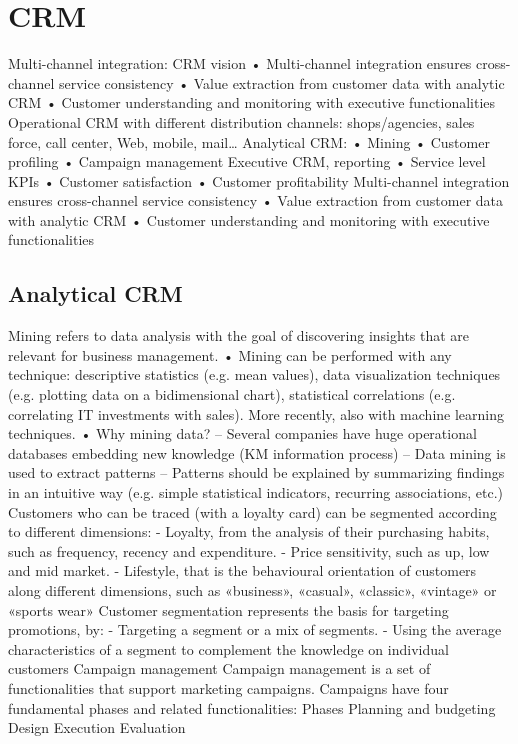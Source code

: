\section{CRM}

Multi-channel integration: CRM vision
• Multi-channel integration ensures cross-channel service consistency
• Value extraction from customer data with analytic CRM
• Customer understanding and monitoring with executive functionalities
Operational CRM with different distribution channels: shops/agencies, sales force, call center, Web,
mobile, mail…
Analytical CRM:
• Mining
• Customer profiling
• Campaign management
Executive CRM, reporting
• Service level KPIs
• Customer satisfaction
• Customer profitability
Multi-channel integration ensures cross-channel service consistency
• Value extraction from customer data with analytic CRM
• Customer understanding and monitoring with executive functionalities

\subsection{Analytical CRM}
Mining refers to data analysis with the goal of discovering insights that are relevant
for business management.
• Mining can be performed with any technique: descriptive statistics (e.g. mean
values), data visualization techniques (e.g. plotting data on a bidimensional chart),
statistical correlations (e.g. correlating IT investments with sales). More recently,
also with machine learning techniques.
• Why mining data?
– Several companies have huge operational databases embedding new knowledge (KM
information process)
– Data mining is used to extract patterns
– Patterns should be explained by summarizing findings in an intuitive way (e.g. simple statistical
indicators, recurring associations, etc.)
Customers who can be traced (with a loyalty card) can be segmented according
to different dimensions:
- Loyalty, from the analysis of their purchasing habits, such as frequency,
recency and expenditure.
- Price sensitivity, such as up, low and mid market.
- Lifestyle, that is the behavioural orientation of customers along different
dimensions, such as «business», «casual», «classic», «vintage» or «sports
wear»
Customer segmentation represents the basis for targeting promotions, by:
- Targeting a segment or a mix of segments.
- Using the average characteristics of a segment to complement the
knowledge on individual customers
Campaign management
Campaign management is a set of functionalities that support marketing
campaigns. Campaigns have four fundamental phases and related functionalities:
Phases Planning and 
budgeting Design Execution Evaluation 


